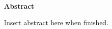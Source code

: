 \documentclass[../main.tex]{subfiles}
\begin{document}
\thispagestyle{plain}
\begin{center}
    \Large
    \textbf{Abstract}
\end{center}
Insert abstract here when finished.
\end{document}

